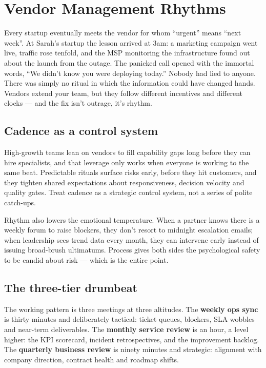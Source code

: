 \section{Vendor Management Rhythms}
Every startup eventually meets the vendor for whom ``urgent'' means ``next week''. At Sarah's startup the lesson arrived at 3am: a marketing campaign went live, traffic rose tenfold, and the MSP monitoring the infrastructure found out about the launch from the outage. The panicked call opened with the immortal words, ``We didn't know you were deploying today.'' Nobody had lied to anyone. There was simply no ritual in which the information could have changed hands. Vendors extend your team, but they follow different incentives and different clocks — and the fix isn't outrage, it's rhythm.



\subsection{Cadence as a control system}


High-growth teams lean on vendors to fill capability gaps long before they can hire specialists, and that leverage only works when everyone is working to the same beat. Predictable rituals surface risks early, before they hit customers, and they tighten shared expectations about responsiveness, decision velocity and quality gates. Treat cadence as a strategic control system, not a series of polite catch-ups.


Rhythm also lowers the emotional temperature. When a partner knows there is a weekly forum to raise blockers, they don't resort to midnight escalation emails; when leadership sees trend data every month, they can intervene early instead of issuing broad-brush ultimatums. Process gives both sides the psychological safety to be candid about risk — which is the entire point.



\subsection{The three-tier drumbeat}


The working pattern is three meetings at three altitudes. The \textbf{weekly ops sync} is thirty minutes and deliberately tactical: ticket queues, blockers, SLA wobbles and near-term deliverables. The \textbf{monthly service review} is an hour, a level higher: the KPI scorecard, incident retrospectives, and the improvement backlog. The \textbf{quarterly business review} is ninety minutes and strategic: alignment with company direction, contract health and roadmap shifts.


